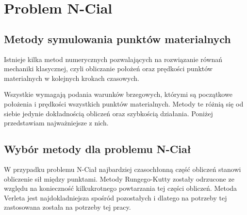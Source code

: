 
\section { Problem N-Cial }




\subsection {Metody symulowania punktów materialnych}

Istnieje kilka metod numerycznych pozwalających na rozwiązanie równań mechaniki klasycznej, czyli obliczanie położeń oraz prędkości punktów materialnych w kolejnych krokach czasowych.

Wszystkie wymagają podania warunków brzegowych, którymi są początkowe położenia i prędkości wszystkich punktów materialnych. Metody te różnią się od siebie jedynie dokładnością obliczeń oraz szybkością działania. Poniżej przedstawiam najważniejsze z nich. \linebreak









\subsection{Wybór metody dla problemu N-Ciał}
W przypadku problemu N-Ciał najbardziej czasochłonną część obliczeń stanowi obliczenie sił między punktami. Metody Rungego-Kutty zostały odrzucone ze względu na konieczność kilkukrotnego powtarzania tej części obliczeń. Metoda Verleta jest najdokladniejsza spośród pozostałych i dlatego na potrzeby tej zastosowana została na potrzeby tej pracy.
